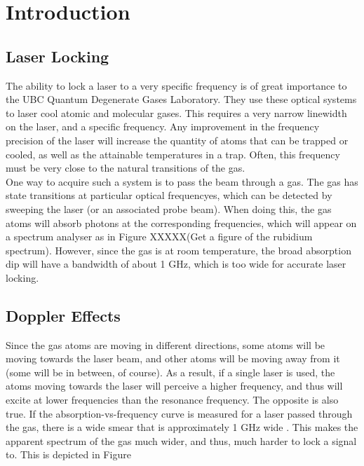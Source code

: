 \newpage
\section{Introduction}

\subsection{Laser Locking}

The ability to lock a laser to a very specific frequency is of great importance to the UBC Quantum Degenerate Gases Laboratory.  They use these optical systems to laser cool atomic and molecular gases.  This requires a very narrow linewidth on the laser, and a specific frequency.  Any improvement in the frequency precision of the laser will increase the quantity of atoms that can be trapped or cooled, as well as the attainable temperatures in a trap.  Often, this frequency must be very close to the natural transitions of the gas. \\

One way to acquire such a system is to pass the beam through a gas.  The gas has state transitions at particular optical frequencyes, which can be detected by sweeping the laser (or an associated probe beam).  When doing this, the gas atoms will absorb photons at the corresponding frequencies, which will appear on a spectrum analyser as in Figure XXXXX(Get a figure of the rubidium spectrum).  However, since the gas is at room temperature, the broad absorption dip will have a bandwidth of about 1 GHz, which is too wide for accurate laser locking.

\subsection{Doppler Effects}

Since the gas atoms are moving in different directions, some atoms will be moving towards the laser beam, and other atoms will be moving away from it (some will be in between, of course).  As a result, if a single laser is used, the atoms moving towards the laser will perceive a higher frequency, and thus will excite at lower frequencies than the resonance frequency.  The opposite is also true.  If the absorption-vs-frequency curve is measured for a laser passed through the gas, there is a wide smear that is approximately 1 GHz wide \cite{madison14}.  This makes the apparent spectrum of the gas much wider, and thus, much harder to lock a signal to.  This is depicted in Figure \\%


